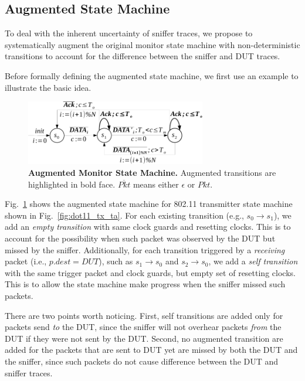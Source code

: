\subsection{Augmented State Machine}
\label{subsec:augment}

To deal with the inherent uncertainty of sniffer traces, we propose to
systematically augment the original monitor state machine with non-deterministic
transitions to account for the difference between the sniffer and DUT traces.


Before formally defining the augmented state machine, we first use an example to
illustrate the basic idea.

\begin{figure}[h!]
  \vspace*{\beforecaptionskip}
  \centering
  \includegraphics[width=0.7\textwidth]{./figures/dot11_tx_checker.pdf}
  \caption{\textbf{Augmented Monitor State Machine.} Augmented transitions are
  highlighted in bold face. $\overline{Pkt}$ means either $\epsilon$ or $Pkt$.}
  \label{fig:augment}
  \vspace*{\aftercaptionskip}
\end{figure}


Fig.~\ref{fig:augment} shows the augmented state machine for 802.11 transmitter
state machine shown in Fig.~\ref{fig:dot11_tx_ta}.  For each existing transition
(e.g., $s_0\rightarrow s_1$), we add an \textit{empty transition} with same
clock guards and resetting clocks.  This is to account for the possibility when
such packet was observed by the DUT but missed by the sniffer.  Additionally,
for each transition triggered by a \textit{receiving} packet (i.e., $p.dest =
DUT$), such as $s_1\rightarrow s_0$ and $s_2\rightarrow s_0$, we add a
\textit{self transition} with the same trigger packet and clock guards, but
empty set of resetting clocks. This is to allow the state machine make progress
when the sniffer missed such packets.

There are two points worth noticing. First, self transitions are added only for
packets send \textit{to} the DUT, since the sniffer will not overhear packets
\textit{from} the DUT if they were not sent by the DUT. Second, no augmented
transition are added for the packets that are sent to DUT yet are missed by both
the DUT and the sniffer, since such packets do not cause difference between the
DUT and sniffer traces.

